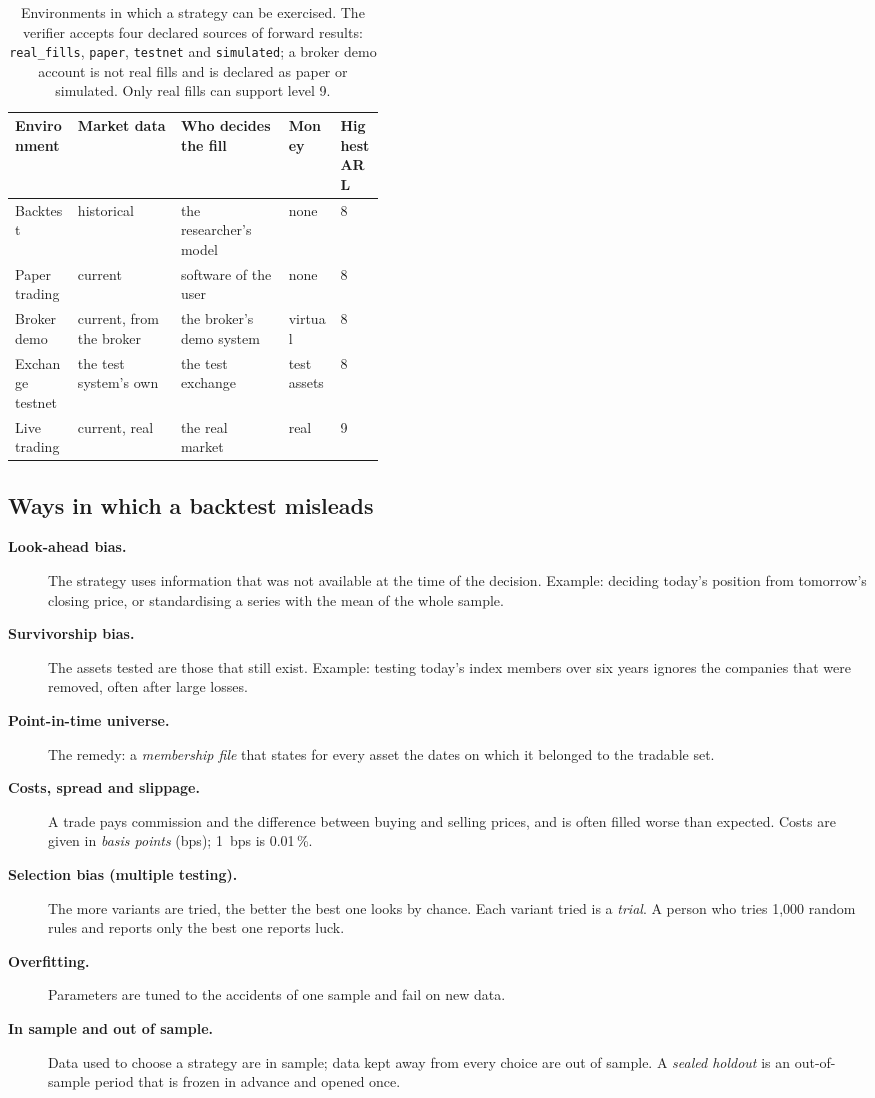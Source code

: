 \documentclass[11pt]{article}
\newcommand{\chk}[1]{\texttt{#1}}
\newcommand{\term}[1]{\item[\textbf{#1}]}
\begin{document}
\begin{table}[ht]
\centering\small
\begin{tabularx}{\linewidth}{@{}p{0.17\linewidth}LLp{0.14\linewidth}p{0.12\linewidth}@{}}
\toprule
Environment & Market data & Who decides the fill & Money & Highest ARL \\
\midrule
Backtest & historical & the researcher's model & none & 8 \\
Paper trading & current & software of the user & none & 8 \\
Broker demo & current, from the broker & the broker's demo system & virtual & 8 \\
Exchange testnet & the test system's own & the test exchange & test assets & 8 \\
Live trading & current, real & the real market & real & 9 \\
\bottomrule
\end{tabularx}
\caption{Environments in which a strategy can be exercised. The verifier accepts four declared sources of forward
results: \chk{real\_fills}, \chk{paper}, \chk{testnet} and \chk{simulated}; a broker demo account is not real fills and
is declared as paper or simulated. Only real fills can support level 9.}\label{tab:modes}
\end{table}

\subsection{Ways in which a backtest misleads}

\begin{description}
\term{Look-ahead bias.} The strategy uses information that was not available at the time of the decision. Example:
deciding today's position from tomorrow's closing price, or standardising a series with the mean of the whole sample.
\term{Survivorship bias.} The assets tested are those that still exist. Example: testing today's index members over six
years ignores the companies that were removed, often after large losses.
\term{Point-in-time universe.} The remedy: a \emph{membership file} that states for every asset the dates on which it
belonged to the tradable set.
\term{Costs, spread and slippage.} A trade pays commission and the difference between buying and selling prices, and is
often filled worse than expected. Costs are given in \emph{basis points} (bps); 1~bps is 0.01\,\%.
\term{Selection bias (multiple testing).} The more variants are tried, the better the best one looks by chance. Each
variant tried is a \emph{trial}. A person who tries 1,000 random rules and reports only the best one reports luck.
\term{Overfitting.} Parameters are tuned to the accidents of one sample and fail on new data.
\term{In sample and out of sample.} Data used to choose a strategy are in sample; data kept away from every choice are
out of sample. A \emph{sealed holdout} is an out-of-sample period that is frozen in advance and opened once.
\end{description}
\end{document}
